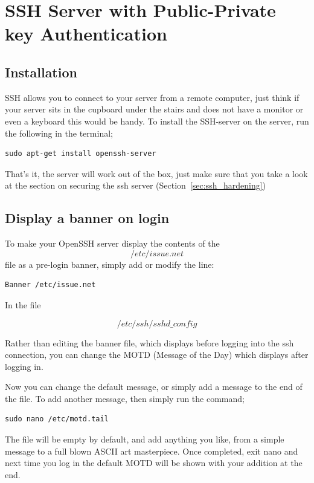 \chapter{SSH Server with Public-Private key Authentication}
\label{chp:ssh}

\section{Installation}

SSH allows you to connect to your server from a remote computer, just think if your server sits in the cupboard under the stairs and does not have a monitor or even a keyboard this would be handy.  To install the SSH-server on the server, run the following in the terminal;

\begin{lstlisting}
sudo apt-get install openssh-server
\end{lstlisting}

That's it, the server will work out of the box, just make sure that you take a look at the section on securing the ssh server (Section~\ref{sec:ssh_hardening})


\section{Display a banner on login}

To make your OpenSSH server display the contents of the $$/etc/issue.net$$ file as a pre-login banner, simply add or modify the line:

\begin{lstlisting}
Banner /etc/issue.net
\end{lstlisting}

In the file

$$/etc/ssh/sshd\_config$$

Rather than editing the banner file, which displays before logging into the ssh connection, you can change the MOTD (Message of the Day) which displays after logging in.

Now you can change the default message, or simply add a message to the end of the file.  To add another message, then simply run the command;

\begin{lstlisting}
sudo nano /etc/motd.tail
\end{lstlisting}

The file will be empty by default, and add anything you like, from a simple message to a full blown ASCII art masterpiece.  Once completed, exit nano and next time you log in the default MOTD will be shown with your addition at the end.


